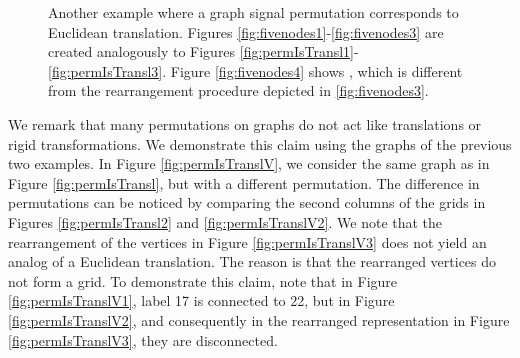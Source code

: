 \documentclass{article}
\begin{document}
\begin{figure}[!ht]
\caption{Another example where a graph signal permutation corresponds to Euclidean translation. Figures \ref{fig:fivenodes1}-\ref{fig:fivenodes3} are created analogously to Figures \ref{fig:permIsTransl1}-\ref{fig:permIsTransl3}. Figure \ref{fig:fivenodes4} shows , which is different from the rearrangement procedure depicted in \ref{fig:fivenodes3}.}
\label{fig:fivenodes}
\end{figure}

{We remark that many permutations on graphs do not act like translations or rigid transformations. We demonstrate this claim using the graphs of the previous two examples. In Figure \ref{fig:permIsTranslV}, we consider the same graph as in Figure \ref{fig:permIsTransl}, but with a different permutation. The difference in permutations can be noticed by comparing the second columns of the grids in Figures \ref{fig:permIsTransl2} and \ref{fig:permIsTranslV2}. We note that the rearrangement of the vertices in Figure \ref{fig:permIsTranslV3} does not yield an analog of a Euclidean translation. The reason is that the rearranged  vertices do not form a grid. To demonstrate this claim, note that in Figure \ref{fig:permIsTranslV1}, label 17 is connected to 22, but in Figure \ref{fig:permIsTranslV2}, and consequently in the rearranged representation in Figure \ref{fig:permIsTranslV3}, they are disconnected.}
\end{document}
